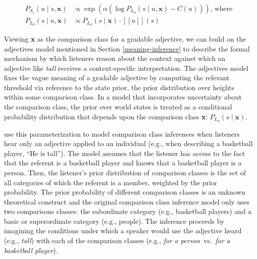 \documentclass{sp}
\newcommand{\gcs}[1]{\textcolor{blue}{[gcs: #1]}}
\newcommand{\sem}[1]{\ensuremath{[\![#1]\!]}}
\begin{document}
\begin{align} \label{S1-context}
P_{S_1}(u\mid s, \textbf{x}) & \propto \exp (\alpha (\log P_{L_0}(s \mid u, \textbf{x}) - C(u)))\text{, where} \\
  P_{L_0}(s \mid u, \textbf{x}) & \propto P_{L_0}(s \mid \textbf{x})  \cdot \sem{u}(s) \nonumber
\end{align}

Viewing \textbf{x} as the comparison class for a gradable adjective, we can build on the \citeauthor{lassitergoodman2013} adjectives model mentioned in Section \ref{meaning-inference} to describe the formal mechanism by which listeners reason about the context against which an adjective like \emph{tall} receives a context-specific interpretation. The adjectives model fixes the vague meaning of a gradable adjective by computing the relevant threshold via reference to the state prior, the prior distribution over heights within some comparison class. In a model that incorporates uncertainty about the comparison class, the prior over world states is treated as a conditional probability distribution that depends upon the comparison class \textbf{x}: $P_{L_0}(s\mid \textbf{x})$.


\cite{tessler2017comparisonclass} use this parameterization to model comparison class inferences when listeners hear only an adjective applied to an individual (e.g., when describing a basketball player, ``He is tall'').
The model assumes that the listener has access to the fact that the referent is a basketball player and knows that a basketball player is a person. Then, the listener's prior distribution of comparison classes is the set of all categories of which the referent is a member, weighted by the prior probability. The prior probability of different comparison classes is an unknown theoretical construct and the original comparison class inference model only uses two comparisons classes: the subordinate category (e.g., basketball players) and a basic or superordinate category (e.g., people). The inference proceeds by imagining the conditions under which a speaker would use the adjective heard (e.g., \emph{tall}) with each of the comparison classes (e.g., \emph{for a person}~vs.~\emph{for a basketball player}).


\end{document}
